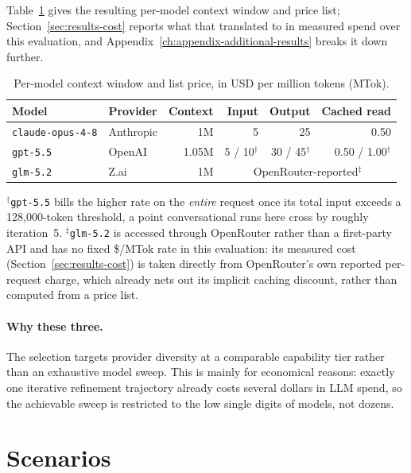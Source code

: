 Table~\ref{tab:setup-model-config} gives the resulting per-model context
window and price list; Section~\ref{sec:results-cost} reports what that
translated to in measured spend over this evaluation, and
Appendix~\ref{ch:appendix-additional-results} breaks it down further.

\begin{table}[htbp]
  \centering
  \caption{Per-model context window and list price, in USD per million
    tokens (MTok).}
  \label{tab:setup-model-config}
  \small
  \begin{tabular}{@{}llrrrr@{}}
    \toprule
    \textbf{Model} & \textbf{Provider} & \textbf{Context} & \textbf{Input} & \textbf{Output} & \textbf{Cached read} \\
    \midrule
    \texttt{claude-opus-4-8} & Anthropic & 1M & 5 & 25 & 0.50 \\
    \texttt{gpt-5.5} & OpenAI & 1.05M & 5 / 10$^\dagger$ & 30 / 45$^\dagger$ & 0.50 / 1.00$^\dagger$ \\
    \texttt{glm-5.2} & Z.ai & 1M & \multicolumn{3}{c}{OpenRouter-reported$^\ddagger$} \\
    \bottomrule
  \end{tabular}
  \vspace{0.5em}

  \small
  $^\dagger$\texttt{gpt-5.5} bills the higher rate on the \emph{entire}
  request once its total input exceeds a 128{,}000-token threshold, a
  point conversational runs here cross by roughly iteration~5.
  $^\ddagger$\texttt{glm-5.2} is accessed through OpenRouter rather than a
  first-party API and has no fixed \$/MTok rate in this evaluation: its
  measured cost (Section~\ref{sec:results-cost}) is taken directly from
  OpenRouter's own reported per-request charge, which already nets out its
  implicit caching discount, rather than computed from a price list.
\end{table}

\paragraph{Why these three.} The selection targets provider diversity at a
comparable capability tier rather than an exhaustive model sweep. This is
mainly for economical reasons: exactly one iterative refinement trajectory
already costs several dollars in LLM spend, so the achievable sweep is
restricted to the low single digits of models, not dozens.


\section{Scenarios}
\label{sec:setup-scenarios}

